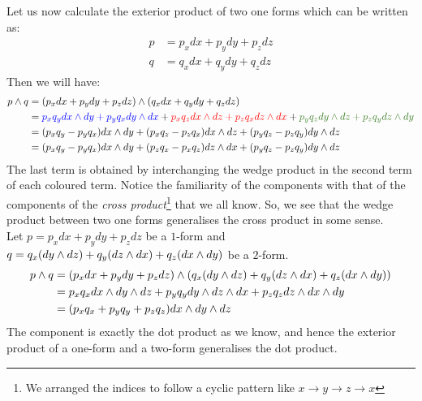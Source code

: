 Let us now calculate the exterior product of two one forms which can be written as:
\begin{align*}
    p &= p_x dx + p_y dy+p_zdz\\
    q &= q_x dx + q_y dy+q_zdz
\end{align*}
Then we will have:
\begin{align*}
    \ext{p}{q} &= \ext{( p_x dx + p_y dy+p_zdz)}{(q_x dx + q_y dy+q_zdz)}\\
    &=\mathcolor{blue}{p_xq_y \ext{dx}{dy} + p_yq_x \ext{dy}{dx}} + \mathcolor{red}{p_xq_z\ext{dx}{dz} + p_zq_x\ext{dz}{dx}}+\mathcolor{OliveGreen}{p_yq_z\ext{dy}{dz} + p_z q_y\ext{dz}{dy}}\\
    &=(p_xq_y - p_yq_x)\ext{dx}{dy} + (p_xq_z-p_zq_x)\ext{dx}{dz}+ (p_yq_z - p_zq_y)\ext{dy}{dz}\\
    &=(p_xq_y - p_yq_x)\ext{dx}{dy} + (p_zq_x-p_xq_z)\ext{dz}{dx} + (p_yq_z - p_zq_y)\ext{dy}{dz}
\end{align*}
The last term is obtained by interchanging the wedge product in the second term of each coloured term. Notice the familiarity of the components with that of the components of the \textit{cross product}\footnote{We arranged the indices to follow a cyclic pattern like $x\rightarrow y \rightarrow z \rightarrow x$} that we all know. So, we see that the wedge product between two one forms generalises the cross product in some sense. \\[0.2cm]
Let $p = p_x dx + p_y dy+p_zdz$ be a $1$-form and $q = q_x(dy \wedge dz)+q_y(dz \wedge dx)+q_z( dx \wedge dy) $ be a $2$-form.
\begin{align*}
    p \wedge q &= (p_x dx + p_y dy+p_zdz) \wedge (q_x(dy \wedge dz)+q_y(dz \wedge dx)+q_z( dx \wedge dy))\\
    &= p_xq_xdx \wedge dy \wedge dz+ p_yq_y dy \wedge dz \wedge dx+p_zq_zdz \wedge dx \wedge dy\\
    &=(p_xq_x+p_yq_y+p_zq_z)dx \wedge dy \wedge dz
\end{align*}
The component is exactly the dot product as we know, and hence the exterior product of a one-form and a two-form generalises the dot product. 

